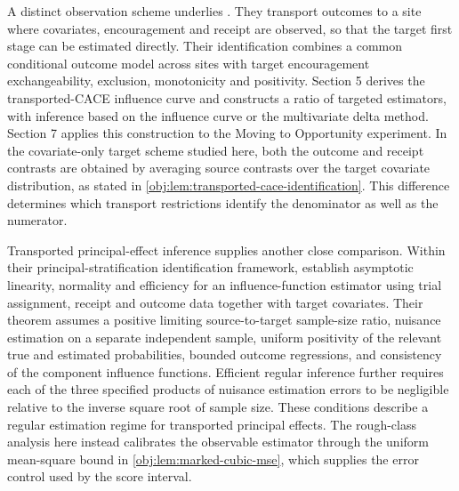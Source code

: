 A distinct observation scheme underlies \citet[Sections 5 and 7]{RudolphVanDerLaan2017Robust}. They transport outcomes to a site where covariates, encouragement and receipt are observed, so that the target first stage can be estimated directly. Their identification combines a common conditional outcome model across sites with target encouragement exchangeability, exclusion, monotonicity and positivity. Section 5 derives the transported-CACE influence curve and constructs a ratio of targeted estimators, with inference based on the influence curve or the multivariate delta method. Section 7 applies this construction to the Moving to Opportunity experiment. In the covariate-only target scheme studied here, both the outcome and receipt contrasts are obtained by averaging source contrasts over the target covariate distribution, as stated in \cref{obj:lem:transported-cace-identification}. This difference determines which transport restrictions identify the denominator as well as the numerator.

Transported principal-effect inference supplies another close comparison. Within their principal-stratification identification framework, \citet[Theorem 6]{Clark2024} establish asymptotic linearity, normality and efficiency for an influence-function estimator using trial assignment, receipt and outcome data together with target covariates. Their theorem assumes a positive limiting source-to-target sample-size ratio, nuisance estimation on a separate independent sample, uniform positivity of the relevant true and estimated probabilities, bounded outcome regressions, and consistency of the component influence functions. Efficient regular inference further requires each of the three specified products of nuisance estimation errors to be negligible relative to the inverse square root of sample size. These conditions describe a regular estimation regime for transported principal effects. The rough-class analysis here instead calibrates the observable estimator through the uniform mean-square bound in \cref{obj:lem:marked-cubic-mse}, which supplies the error control used by the score interval.

